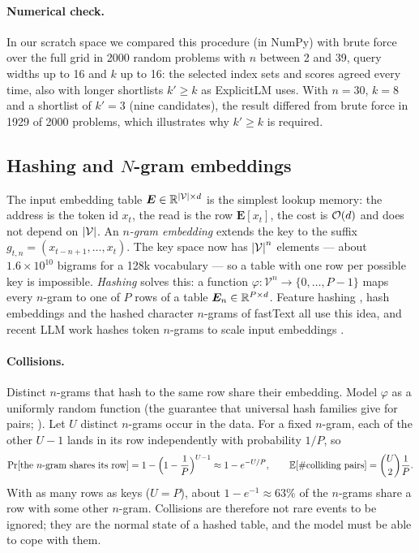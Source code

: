 \paragraph{Numerical check.} In our scratch space we compared this procedure (in NumPy) with brute
force over the full grid in 2000 random problems with $n$ between 2 and 39, query widths up to 16
and $k$ up to 16: the selected index sets and scores agreed every time, also with longer
shortlists $k' \ge k$ as ExplicitLM uses. With $n = 30$, $k = 8$ and a shortlist of $k' = 3$
(nine candidates), the result differed from brute force in 1929 of 2000 problems, which
illustrates why $k' \ge k$ is required.

\subsection{Hashing and \texorpdfstring{$N$}{N}-gram embeddings}\label{sec:c10-hashing}

The input embedding table $\bm{E} \in \mathbb{R}^{\left\lvert \mathcal{V}\right\rvert \times d}$ is the simplest lookup memory:
the address is the token id $x_t$, the read is the row $\bm{E}[x_t]$, the cost is $\mathcal{O}(d)$ and does
not depend on $\left\lvert \mathcal{V}\right\rvert$. An \emph{$n$-gram embedding} extends the key to the suffix
$g_{t,n} = (x_{t-n+1},\dots,x_t)$. The key space now has $\left\lvert \mathcal{V}\right\rvert^n$ elements --- about
$1.6 \times 10^{10}$ bigrams for a 128k vocabulary --- so a table with one row per possible key is
impossible. \emph{Hashing} solves this: a function $\varphi : \mathcal{V}^n \to \{0,\dots,P-1\}$
maps every $n$-gram to one of $P$ rows of a table $\bm{E}_n \in \mathbb{R}^{P \times d}$. Feature hashing
\citep{c10-weinberger2009hashing}, hash embeddings \citep{c10-svenstrup2017hash} and the hashed
character $n$-grams of fastText \citep{c10-bojanowski2017fasttext} all use this idea, and recent
LLM work hashes token $n$-grams to scale input embeddings
\citep{c10-huang2025overtokenized,c10-yu2025scone,c10-pagnoni2025blt}.

\paragraph{Collisions.} Distinct $n$-grams that hash to the same row share their embedding.
Model $\varphi$ as a uniformly random function (the guarantee that universal hash families give
for pairs; \citealp{c10-carter1979universal}). Let $U$ distinct $n$-grams occur in the data. For a
fixed $n$-gram, each of the other $U-1$ lands in its row independently with probability $1/P$,
so
\begin{equation}
  \Pr[\text{the $n$-gram shares its row}] = 1 - \Bigl(1 - \frac{1}{P}\Bigr)^{U-1}
  \approx 1 - e^{-U/P},
  \qquad
  \mathbb{E}[\#\text{colliding pairs}] = \binom{U}{2}\frac{1}{P} .
  \label{eq:c10-collide}
\end{equation}
With as many rows as keys ($U = P$), about $1 - e^{-1} \approx 63\%$ of the $n$-grams share a row
with some other $n$-gram. Collisions are therefore not rare events to be ignored; they are the
normal state of a hashed table, and the model must be able to cope with them.


